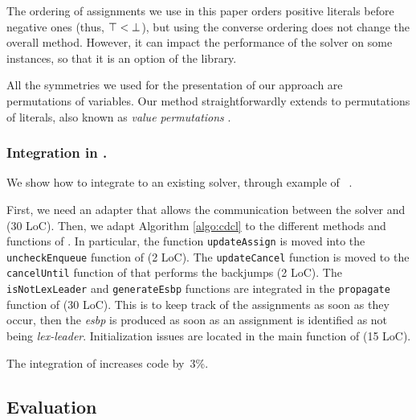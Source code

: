 The ordering of assignments we use in this paper orders positive literals
before negative ones (thus, $\top < \bot$), but using the converse
ordering does not change the overall method. However, it can impact the
performance of the solver on some instances, so that it is an option of the
library.

All the symmetries we used for the presentation of our approach are
permutations of variables. Our method straightforwardly extends to permutations of literals, also known as \emph{value permutations} \cite{biere2009handbook}.


\subsubsection{Integration in \minisat{}.} We show how to integrate \libdsb{}
to an existing solver, through example of \minisat{}~\cite{een2003extensible}.

First, we need an adapter that allows the communication between the solver and
\libdsb{} (30 LoC). Then, we adapt Algorithm \ref{algo:cdcl} to the different
methods and functions of \minisat{}. In particular, the function
\texttt{updateAssign} is moved into the \texttt{uncheckEnqueue} function of
\minisat{} (2 LoC). The \texttt{updateCancel} function is moved to the
\texttt{cancelUntil} function of \minisat{} that performs the backjumps (2
LoC). The \texttt{isNotLexLeader} and \texttt{generateEsbp} functions are
integrated in the \texttt{propagate} function of \minisat{} (30 LoC). This is
to keep track of the assignments as soon as they occur, then the
\textit{esbp} is produced as soon as an assignment is identified as not being
\emph{lex-leader}. Initialization issues are located in the main function of
\minisat (15 LoC).

The integration of \libdsb{} increases \minisat{} code by~3\%.
 

\subsection{Evaluation}

%

